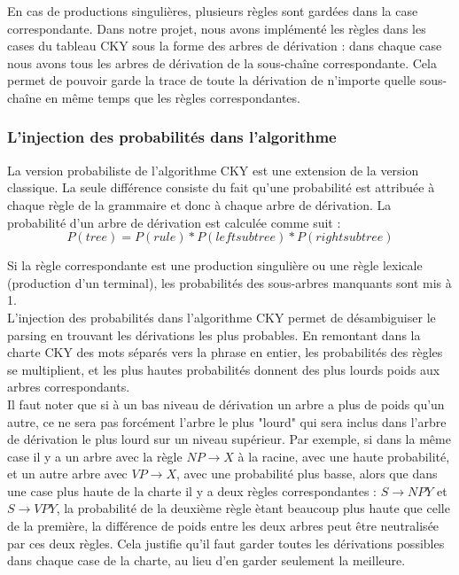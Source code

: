 \documentclass[12pt]{article}
\begin{document}
En cas de productions singulières, plusieurs règles sont gardées dans la case
correspondante. Dans notre projet, nous avons implémenté les règles dans les
cases du tableau CKY sous la forme des arbres de dérivation : dans chaque case
nous avons tous les arbres de dérivation de la sous-chaîne correspondante. Cela
permet de pouvoir garde la trace de toute la dérivation de n'importe quelle
sous-chaîne en même temps que les règles correspondantes. 

\subsubsection{L'injection des probabilités dans l'algorithme}

La version probabiliste de l'algorithme CKY est une extension de la version
classique. La seule différence consiste du fait qu'une probabilité est attribuée
à chaque règle de la grammaire et donc à chaque arbre de dérivation. La
probabilité d'un arbre de dérivation est calculée comme suit : 
$$P(tree) = P(rule) * P(left subtree) * P(right subtree)$$

Si la règle correspondante est une production singulière ou une règle lexicale
(production d'un terminal), les probabilités des sous-arbres manquants sont mis
à 1. \\

L'injection des probabilités dans l'algorithme CKY permet de désambiguiser le
parsing en trouvant les dérivations les plus probables. En remontant dans la
charte CKY des mots séparés vers la phrase en entier, les probabilités des
règles se multiplient, et les plus hautes probabilités donnent des plus lourds
poids aux arbres correspondants. \\

Il faut noter que si à un bas niveau de
dérivation un arbre a plus de poids qu'un autre, ce ne sera pas forcément
l'arbre le plus "lourd"  qui sera inclus dans l'arbre de dérivation le plus
lourd sur un niveau supérieur. Par exemple, si dans la même case il y a un arbre
avec la règle $NP \rightarrow X$ à la racine, avec une haute probabilité, et un
autre arbre avec $VP \rightarrow X$, avec une probabilité plus basse, alors que
dans une case plus haute de la charte il y a deux règles correspondantes : $S
\rightarrow NP Y$ et $S \rightarrow VP Y$, la probabilité de la deuxième règle
ètant beaucoup plus haute que celle de la première, la différence de poids entre
les deux arbres peut être neutralisée par ces deux règles. Cela justifie qu'il
faut garder toutes les dérivations possibles dans chaque case de la charte, au
lieu d'en garder seulement la meilleure. \\
\end{document}
